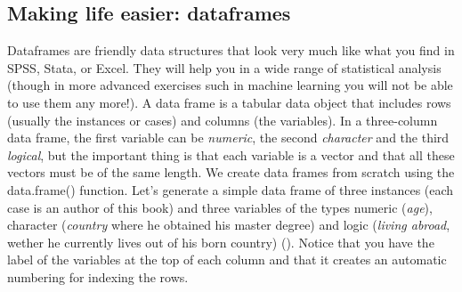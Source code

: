 \subsection{Making life easier: dataframes}

Dataframes are friendly data structures that look very much like
what you find in SPSS, Stata, or Excel. They will help you in a wide
range of statistical analysis (though in more advanced exercises such
in machine learning you will not be able to use them any more!).  A
data frame is a tabular data object that includes rows (usually the
instances or cases) and columns (the variables). In a three-column data frame,
the first variable can be \emph{numeric}, the second \emph{character}
and the third \emph{logical}, but the important thing is that each
variable is a vector and that all these vectors must be of the same
length. We create data frames from scratch using the data.frame()
function.  Let’s generate a simple data frame of three instances (each
case is an author of this book) and three variables of the types
numeric (\emph{age}), character (\emph{country} where he obtained his
master degree) and logic (\emph{living abroad}, wether he currently
lives out of his born country) ().
Notice that you have the label of the variables at the top of each column and that it creates an automatic numbering for indexing the rows.  


